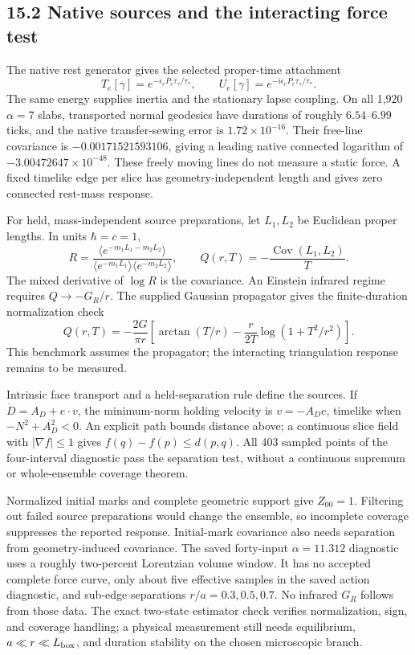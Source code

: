 \documentclass[11pt]{article}
\begin{document}
\subsection{15.2 Native sources and the interacting force test}

The native rest generator gives the selected proper-time
attachment
\[
T_e[\gamma]=e^{-\epsilon_eP_e\tau_\gamma/\tau_*},
\qquad
U_e[\gamma]=e^{-i\epsilon_eP_e\tau_\gamma/\tau_*}.
\]
The same energy supplies inertia and the stationary lapse
coupling. On all 1,920 \(\alpha=7\) slabs, transported normal
geodesics have durations of roughly \(6.54\)--\(6.99\) ticks,
and the native transfer-sewing error is
\(1.72\times10^{-16}\).
Their free-line covariance is \(-0.00171521593106\), giving
a leading native connected logarithm of
\(-3.00472647\times10^{-48}\).
These freely moving lines do not measure a static force.
A fixed timelike edge per slice has geometry-independent
length and gives zero connected rest-mass response.

For held, mass-independent source preparations, let \(L_1,L_2\)
be Euclidean proper lengths. In units \(\hbar=c=1\),
\[
R=\frac{\langle e^{-m_1L_1-m_2L_2}\rangle}
{\langle e^{-m_1L_1}\rangle\langle e^{-m_2L_2}\rangle},
\qquad
Q(r,T)=-\frac{\operatorname{Cov}(L_1,L_2)}{T}.
\]
The mixed derivative of \(\log R\) is the covariance.
An Einstein infrared regime requires \(Q\to-G_R/r\).
The supplied Gaussian propagator gives the finite-duration
normalization check
\[
Q(r,T)=-\frac{2G}{\pi r}
\left[\arctan(T/r)-\frac{r}{2T}\log(1+T^2/r^2)\right].
\]
This benchmark assumes the propagator; the interacting
triangulation response remains to be measured.

Intrinsic face transport and a held-separation rule define
the sources. If \(\dot D=A_D+e\cdot v\), the minimum-norm
holding velocity is \(v=-A_De\), timelike when
\(-N^2+A_D^2<0\).
An explicit path bounds distance above; a continuous slice
field with \(|\nabla f|\le1\) gives
\(f(q)-f(p)\le d(p,q)\).
All 403 sampled points of the four-interval diagnostic pass
the separation test, without a continuous supremum or
whole-ensemble coverage theorem.

Normalized initial marks and complete geometric support
give \(Z_{00}=1\). Filtering out failed source preparations
would change the ensemble, so incomplete coverage suppresses
the reported response. Initial-mark covariance also needs
separation from geometry-induced covariance.
The saved forty-input \(\alpha=11.312\) diagnostic uses a
roughly two-percent Lorentzian volume window. It has no
accepted complete force curve, only about five effective
samples in the saved action diagnostic, and sub-edge
separations \(r/a=0.3,0.5,0.7\).
No infrared \(G_R\) follows from those data.
The exact two-state estimator check verifies normalization,
sign, and coverage handling; a physical measurement still
needs equilibrium, \(a\ll r\ll L_{\rm box}\), and duration
stability on the chosen microscopic branch.
\end{document}
